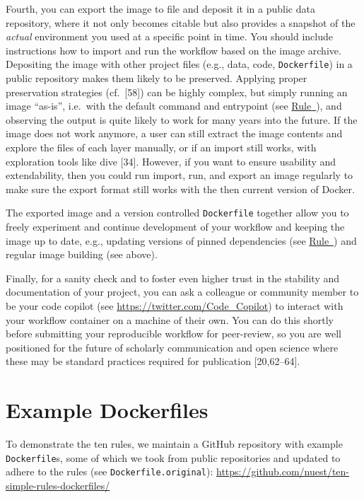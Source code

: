 \documentclass[10pt,letterpaper]{article}
\begin{document}
Fourth, you can export the image to file and deposit it in a public data
repository, where it not only becomes citable but also provides a
snapshot of the \emph{actual} environment you used at a specific point
in time. You should include instructions how to import and run the
workflow based on the image archive. Depositing the image with other
project files (e.g., data, code, \texttt{Dockerfile}) in a public
repository makes them likely to be preserved. Applying proper
preservation strategies (cf.~{[}58{]}) can be highly complex, but simply
running an image ``as-is'', i.e.~with the default command and entrypoint
(see \hyperref[{rule:interactive}]{Rule~}),
and observing the output is quite likely to work for many years into the
future. If the image does not work anymore, a user can still extract the
image contents and explore the files of each layer manually, or if an
import still works, with exploration tools like dive {[}34{]}. However,
if you want to ensure usability and extendability, then you could run
import, run, and export an image regularly to make sure the export
format still works with the then current version of Docker.

The exported image and a version controlled \texttt{Dockerfile} together
allow you to freely experiment and continue development of your workflow
and keeping the image up to date, e.g., updating versions of pinned
dependencies (see
\hyperref[{rule:pinning}]{Rule~}) and regular
image building (see above).

Finally, for a sanity check and to foster even higher trust in the
stability and documentation of your project, you can ask a colleague or
community member to be your code copilot (see
\url{https://twitter.com/Code_Copilot}) to interact with your workflow
container on a machine of their own. You can do this shortly before
submitting your reproducible workflow for peer-review, so you are well
positioned for the future of scholarly communication and open science
where these may be standard practices required for publication
{[}20,62--64{]}.

\hypertarget{example-dockerfiles}{%
\section{Example Dockerfiles}\label{example-dockerfiles}}

To demonstrate the ten rules, we maintain a GitHub repository with
example \texttt{Dockerfile}s, some of which we took from public
repositories and updated to adhere to the rules (see
\texttt{Dockerfile.original}):
\url{https://github.com/nuest/ten-simple-rules-dockerfiles/}
\end{document}
